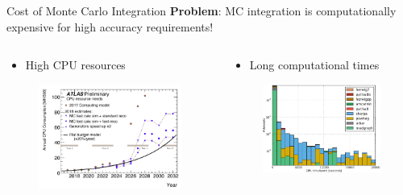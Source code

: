 \documentclass[t,handout,professionalfont,serif]{beamer}
\begin{document}
\begin{frame}{Cost of Monte Carlo Integration}
	\scriptsize
	\textbf{Problem}: MC integration is computationally expensive for high accuracy requirements!
\begin{columns}
	\begin{column}{0.5 \textwidth}
		\begin{itemize}
			\item High CPU resources
		\end{itemize}
		\begin{figure}[h]
			\centering
			\includegraphics[width = \columnwidth]{../tex/images/CPU-cost.png}
				\label{CPU cost}
			\end{figure}
	\end{column}
	\begin{column}{0.5 \textwidth}
		\begin{itemize}
			\item Long computational times
		\end{itemize}
	\begin{figure}[h]
		\centering
		\includegraphics[width = \columnwidth]{../tex/images/CPU-time.png}

\end{figure}
\end{column}
\end{columns}
\end{frame}
\end{document}
